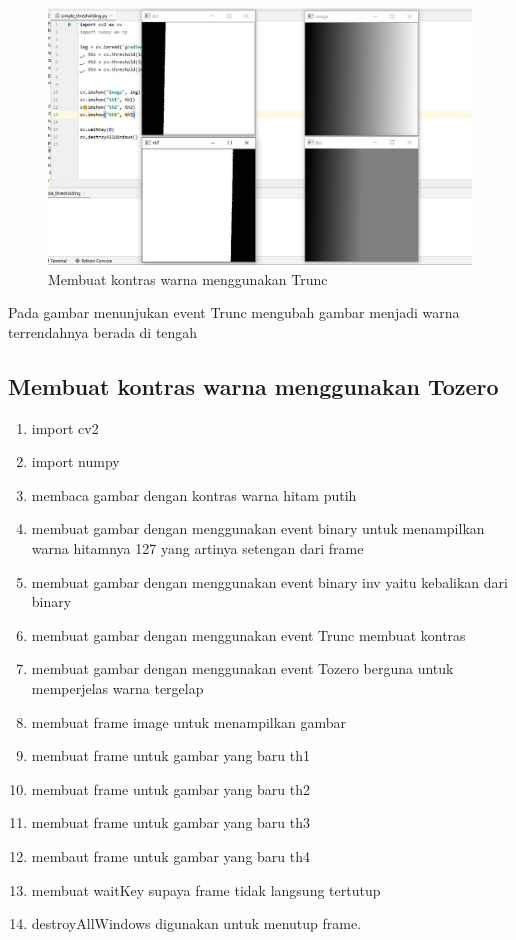 \newpage
\begin{figure}[ht]
\centering
\includegraphics[scale=0.42]{figures/2,40.jpg}
\caption{Membuat kontras warna menggunakan Trunc}
\label{contoh}
\end{figure}
Pada gambar menunjukan event Trunc mengubah gambar menjadi warna terrendahnya berada di tengah




\newpage
\subsection{Membuat kontras warna menggunakan Tozero}

\begin{enumerate}
	\item import cv2
	\item import numpy
	\item membaca gambar dengan kontras warna hitam putih
	\item membuat gambar dengan menggunakan event binary untuk menampilkan warna hitamnya 127 yang artinya setengan dari frame
	\item membuat gambar dengan menggunakan event binary inv yaitu kebalikan dari binary
	\item membuat gambar dengan menggunakan event Trunc membuat kontras 
	\item membuat gambar dengan menggunakan event Tozero berguna untuk memperjelas warna tergelap
	\item membuat frame image untuk menampilkan gambar
	\item membuat frame untuk gambar yang baru th1
	\item membuat frame untuk gambar yang baru th2
	\item membuat frame untuk gambar yang baru th3
	\item membaut frame untuk gambar yang baru th4
	\item membuat waitKey supaya frame tidak langsung tertutup
	\item destroyAllWindows digunakan untuk menutup frame.
\end{enumerate}

